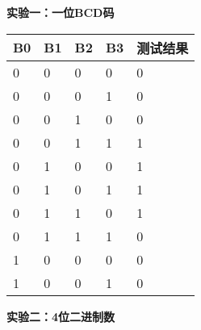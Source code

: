 \documentclass[a4paper,12pt]{article}
\begin{document}
\begin{table}[h]
   \begin{minipage}{0.48\textwidth}
       \centering
       \textbf{实验一：一位BCD码}
       \begin{tabular}{|l|l|l|l|l|}
           \hline
           \textbf{B0} & \textbf{B1} & \textbf{B2} & \textbf{B3} & \textbf{测试结果} \\ \hline
           0           & 0           & 0           & 0           & 0          \\ \hline
           0           & 0           & 0           & 1           & 0          \\ \hline
           0           & 0           & 1           & 0           & 0          \\ \hline
           0           & 0           & 1           & 1           & 1          \\ \hline
           0           & 1           & 0           & 0           & 1          \\ \hline
           0           & 1           & 0           & 1           & 1          \\ \hline
           0           & 1           & 1           & 0           & 1          \\ \hline
           0           & 1           & 1           & 1           & 0          \\ \hline
           1           & 0           & 0           & 0           & 0          \\ \hline
           1           & 0           & 0           & 1           & 0          \\ \hline
       \end{tabular}
   \end{minipage}
   \hfill
   \begin{minipage}{0.48\textwidth}
       \centering
       \textbf{实验二：4位二进制数}
       

\end{minipage}
\end{table}
\end{document}
